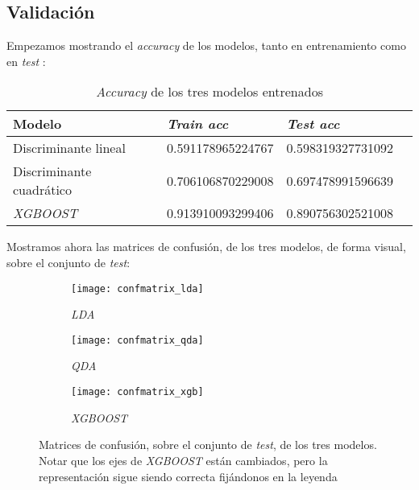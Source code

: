 \subsection{Validación} \label{section:validacion}

Empezamos mostrando el \textit{accuracy} de los modelos, tanto en entrenamiento como en \textit{test} \footnotemark:


\begin{table}[H]
\centering
\begin{tabular}{|l|l|l|l}
\hline
    Modelo               & \textit{Train acc} & \textit{Test acc}          \\
\hline
Discriminante lineal     & 0.591178965224767  & 0.598319327731092 \\
Discriminante cuadrático & 0.706106870229008  & 0.697478991596639 \\
\textit{XGBOOST}         & 0.913910093299406  & 0.890756302521008 \\
\hline
\end{tabular}
\caption{\textit{Accuracy} de los tres modelos entrenados}
\end{table}

Mostramos ahora las matrices de confusión, de los tres modelos, de forma visual, sobre el conjunto de \textit{test}:

\begin{figure}[H]
    \centering
    \begin{subfigure}{0.45\textwidth}
        \texttt{[image: confmatrix\_lda]}
        \caption{\textit{LDA}}
    \end{subfigure}
    \begin{subfigure}{0.45\textwidth}
        \texttt{[image: confmatrix\_qda]}
        \caption{\textit{QDA}}
    \end{subfigure}

    \begin{subfigure}{0.45\textwidth}
        \texttt{[image: confmatrix\_xgb]}
        \caption{\textit{XGBOOST}}
    \end{subfigure}

    \caption{Matrices de confusión, sobre el conjunto de \textit{test}, de los tres modelos. Notar que los ejes de \textit{XGBOOST} están cambiados, pero la representación sigue siendo correcta fijándonos en la leyenda}
\end{figure}

